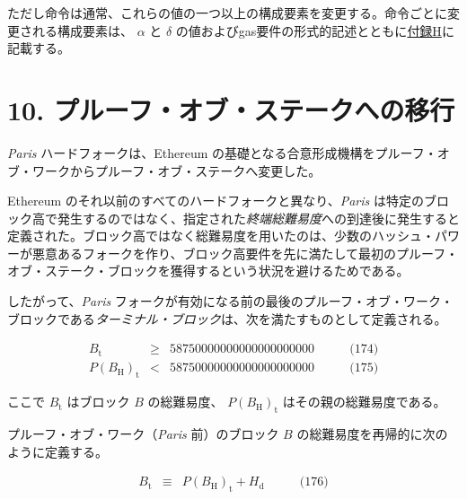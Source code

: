 \documentclass[
]{ltjsarticle}
\begin{document}
ただし命令は通常、これらの値の一つ以上の構成要素を変更する。命令ごとに変更される構成要素は、
\(\alpha\) と \(\delta\)
の値およびgas要件の形式的記述とともに\protect\hyperlink{app:vm}{付録H}に記載する。

\protect\hypertarget{ch:pos_transition}{}{}

\hypertarget{ux30d7ux30ebux30fcux30d5ux30aaux30d6ux30b9ux30c6ux30fcux30afux3078ux306eux79fbux884c}{%
\section{10.
プルーフ・オブ・ステークへの移行}\label{ux30d7ux30ebux30fcux30d5ux30aaux30d6ux30b9ux30c6ux30fcux30afux3078ux306eux79fbux884c}}

\emph{Paris} ハードフォークは、Ethereum
の基礎となる合意形成機構をプルーフ・オブ・ワークからプルーフ・オブ・ステークへ変更した。

Ethereum のそれ以前のすべてのハードフォークと異なり、\emph{Paris}
は特定のブロック高で発生するのではなく、指定された\emph{終端総難易度}への到達後に発生すると定義された。ブロック高ではなく総難易度を用いたのは、少数のハッシュ・パワーが悪意あるフォークを作り、ブロック高要件を先に満たして最初のプルーフ・オブ・ステーク・ブロックを獲得するという状況を避けるためである。

したがって、\emph{Paris}
フォークが有効になる前の最後のプルーフ・オブ・ワーク・ブロックである\emph{ターミナル・ブロック}は、次を満たすものとして定義される。

\protect\hypertarget{eq-174}{}{}\protect\hypertarget{eq-175}{}{}

\[\begin{aligned}
B_{\mathrm{t}} & \geqslant & 58750000000000000000000 & \qquad \text{(174)} \\
P(B_{\mathrm{H}})_{\mathrm{t}} & < & 58750000000000000000000 & \qquad \text{(175)}
\end{aligned}\]

ここで \(B_{\mathrm{t}}\) はブロック \(B\) の総難易度、
\(P(B_{\mathrm{H}})_{\mathrm{t}}\) はその親の総難易度である。

プルーフ・オブ・ワーク（\emph{Paris} 前）のブロック \(B\)
の総難易度を再帰的に次のように定義する。

\protect\hypertarget{eq-176}{}{}

\[\begin{aligned}
B_{\mathrm{t}} & \equiv & P(B_{\mathrm{H}})_{\mathrm{t}} + H_{\mathrm{d}} & \qquad \text{(176)}
\end{aligned}\]
\end{document}
